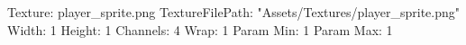 Texture: player_sprite.png
TextureFilePath: "Assets/Textures/player_sprite.png"
Width: 1
Height: 1
Channels: 4
Wrap: 1
Param Min: 1
Param Max: 1